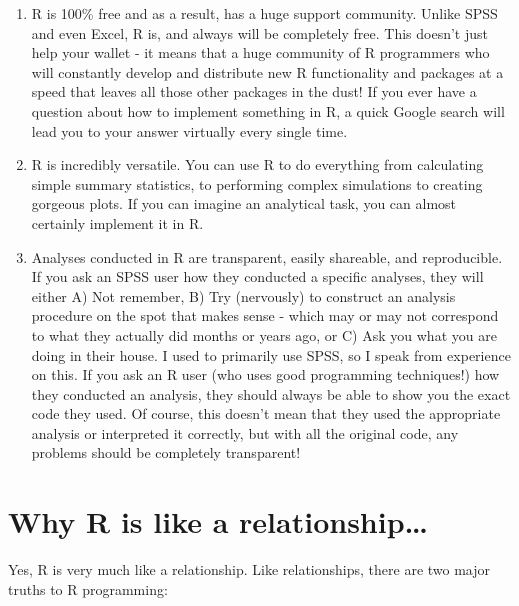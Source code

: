 \documentclass[
]{book}
\begin{document}
\begin{enumerate}
\def\labelenumi{\arabic{enumi}.}
\item
  R is 100\% free and as a result, has a huge support community. Unlike SPSS and even Excel, R is, and always will be completely free. This doesn't just help your wallet - it means that a huge community of R programmers who will constantly develop and distribute new R functionality and packages at a speed that leaves all those other packages in the dust! If you ever have a question about how to implement something in R, a quick Google search will lead you to your answer virtually every single time.
\item
  R is incredibly versatile. You can use R to do everything from calculating simple summary statistics, to performing complex simulations to creating gorgeous plots. If you can imagine an analytical task, you can almost certainly implement it in R.
\item
  Analyses conducted in R are transparent, easily shareable, and reproducible. If you ask an SPSS user how they conducted a specific analyses, they will either A) Not remember, B) Try (nervously) to construct an analysis procedure on the spot that makes sense - which may or may not correspond to what they actually did months or years ago, or C) Ask you what you are doing in their house. I used to primarily use SPSS, so I speak from experience on this. If you ask an R user (who uses good programming techniques!) how they conducted an analysis, they should always be able to show you the exact code they used. Of course, this doesn't mean that they used the appropriate analysis or interpreted it correctly, but with all the original code, any problems should be completely transparent!
\end{enumerate}

\hypertarget{rrelationship}{%
\section{Why R is like a relationship\ldots{}}\label{rrelationship}}

Yes, R is very much like a relationship. Like relationships, there are two major truths to R programming:
\end{document}
